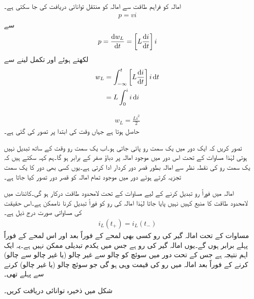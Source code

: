 امالہ کو فراہم طاقت سے امالہ کو منتقل توانائی  دریافت کی جا سکتی ہے۔
\begin{align}
p=vi
\end{align}
سے
\begin{align}\label{مساوات_امالہ_کو_مہیا_طاقت_الف}
p=\frac{\dif w_L}{\dif t}=\left[L \frac{\dif i}{\dif t}\right] i
\end{align}
لکھتے ہوئے اور تکمل لینے سے
\begin{align*}
w_L&=\int_{-\infty}^{t} \left[L\frac{\dif i}{\dif t}\right]i\dif t\\
&=L\int_{0}^{i} i \dif i
\end{align*}

\begin{align}
w_L=\frac{Li^2}{2}
\end{align}
حاصل ہوتا ہے جہاں وقت کی ابتدا  پر  تصور کی گئی ہے۔

تصور کریں کہ ایک دور میں یک سمت رو پائی جاتی ہو۔اب یک سمت رو وقت کے ساتھ تبدیل نہیں ہوتی لہٰذا مساوات  کے تحت اس دور میں موجود امالہ پر دباؤ صفر کے برابر ہو گا۔ہم کہہ سکتے ہیں کہ یک سمت رو کی نقطہ نظر سے امالہ بطور قصر دور کردار ادا کرتی ہے۔یوں کسی بھی دور کا یک سمت تجزیہ کرتے ہوئے دور میں موجود تمام امالہ کو قصر دور تصور کیا جاتا ہے۔

امالہ میں فوراً رو تبدیل کرنے کے لیے مساوات  کے تحت  لامحدود طاقت درکار ہو گی۔کائنات میں لامحدود طاقت کا منبع کہیں نہیں پایا جاتا لہٰذا امالہ کی رو کو فوراً تبدیل کرنا ناممکن ہے۔اس حقیقت کی مساواتی صورت درج ذیل ہے۔
\begin{align}\label{مساوات_امالہ_امالہ_گیر_رو_بلا_جوڑ_ہے}
i_L(t_+)=i_L(t_-)
\end{align}
مساوات  کے تحت امالہ گیر کی رو کسی بھی لمحے  کے فوراً بعد  اور اس لمحے کے فوراً  پہلے  برابر ہوں گے۔یوں امالہ گیر کی رو  ہے جس میں  یکدم تبدیلی ممکن نہیں ہے۔یہ ایک اہم نتیجہ ہے جس کے تحت دور میں سوئچ کو چالو سے غیر چالو (یا غیر چالو سے چالو) کرنے کے فوراً بعد امالہ میں رو کی قیمت وہی ہو گی جو سوئچ چالو (یا غیر چالو) کرنے سے پہلے تھی۔

شکل  میں ذخیرہ توانائی دریافت کریں۔

